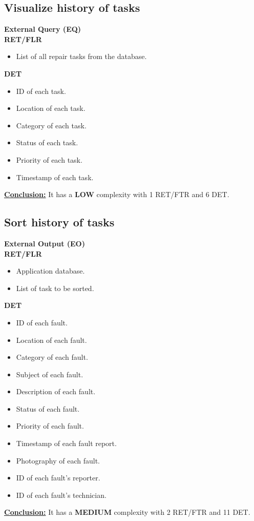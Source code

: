 \subsection{Visualize history of tasks}
\textbf{External Query (EQ)} \\ 
\textbf{RET/FLR}
\begin{itemize}
\item List of all repair tasks from the database.
\end{itemize}
\textbf{DET}
\begin{itemize}
\item ID of each task.
\item Location of each task.
\item Category of each task.
\item Status of each task.
\item Priority of each task.
\item Timestamp of each task.
\end{itemize}
\textbf{\underline{Conclusion:}} It has a \textbf{LOW} complexity with 1 RET/FTR and 6 DET.

\subsection{Sort history of tasks}
\textbf{External Output (EO)} \\ 
\textbf{RET/FLR}
\begin{itemize}
\item Application database.
\item List of task to be sorted.
\end{itemize}
\textbf{DET}
\begin{itemize}
\item ID of each fault.
\item Location of each fault.
\item Category of each fault.
\item Subject of each fault.
\item Description of each fault.
\item Status of each fault.
\item Priority of each fault.
\item Timestamp of each fault report.
\item Photography of each fault.
\item ID of each fault's reporter.
\item ID of each fault's technician.
\end{itemize}
\textbf{\underline{Conclusion:}} It has a \textbf{MEDIUM} complexity with 2 RET/FTR and 11 DET.

